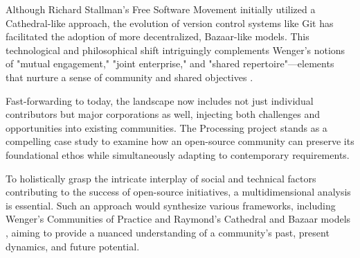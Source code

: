 Although Richard Stallman's Free Software Movement initially utilized a Cathedral-like approach, the evolution of version control systems like Git has facilitated the adoption of more decentralized, Bazaar-like models. This technological and philosophical shift intriguingly complements Wenger's notions of "mutual engagement," "joint enterprise," and "shared repertoire"—elements that nurture a sense of community and shared objectives \parencite{wengerCommunitiesPracticeLearning1998}.

Fast-forwarding to today, the landscape now includes not just individual contributors but major corporations as well, injecting both challenges and opportunities into existing communities. The Processing project stands as a compelling case study to examine how an open-source community can preserve its foundational ethos while simultaneously adapting to contemporary requirements.

To holistically grasp the intricate interplay of social and technical factors contributing to the success of open-source initiatives, a multidimensional analysis is essential. Such an approach would synthesize various frameworks, including Wenger's Communities of Practice \parencite{wengerCommunitiesPracticeLearning1998} and Raymond's Cathedral and Bazaar models \parencite{CathedralBazaarMusings2002a}, aiming to provide a nuanced understanding of a community's past, present dynamics, and future potential.

